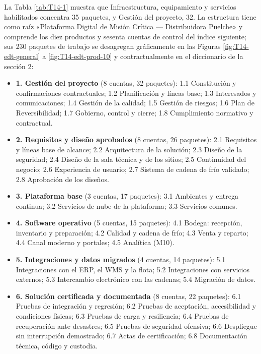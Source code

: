 
La Tabla \ref{tab:T14-1} muestra que Infraestructura, equipamiento y servicios habilitados concentra 35 paquetes, y Gestión del proyecto, 32. La estructura tiene como raíz «Plataforma Digital de Misión Crítica — Distribuidora Puelche» y comprende los diez productos y sesenta cuentas de control del índice siguiente; sus 230 paquetes de trabajo se desagregan gráficamente en las Figuras \ref{fig:T14-edt-general} a \ref{fig:T14-edt-prod-10} y contractualmente en el diccionario de la sección 2:

\begin{itemize}[leftmargin=1.4em,itemsep=2pt]
\item \textbf{1. Gestión del proyecto} (8 cuentas, 32 paquetes): 1.1 Constitución y confirmaciones contractuales; 1.2 Planificación y líneas base; 1.3 Interesados y comunicaciones; 1.4 Gestión de la calidad; 1.5 Gestión de riesgos; 1.6 Plan de Reversibilidad; 1.7 Gobierno, control y cierre; 1.8 Cumplimiento normativo y contractual.
\item \textbf{2. Requisitos y diseño aprobados} (8 cuentas, 26 paquetes): 2.1 Requisitos y líneas base de alcance; 2.2 Arquitectura de la solución; 2.3 Diseño de la seguridad; 2.4 Diseño de la sala técnica y de los sitios; 2.5 Continuidad del negocio; 2.6 Experiencia de usuario; 2.7 Sistema de cadena de frío validado; 2.8 Aprobación de los diseños.
\item \textbf{3. Plataforma base} (3 cuentas, 17 paquetes): 3.1 Ambientes y entrega continua; 3.2 Servicios de nube de la plataforma; 3.3 Servicios comunes.
\item \textbf{4. Software operativo} (5 cuentas, 15 paquetes): 4.1 Bodega: recepción, inventario y preparación; 4.2 Calidad y cadena de frío; 4.3 Venta y reparto; 4.4 Canal moderno y portales; 4.5 Analítica (M10).
\item \textbf{5. Integraciones y datos migrados} (4 cuentas, 14 paquetes): 5.1 Integraciones con el ERP, el WMS y la flota; 5.2 Integraciones con servicios externos; 5.3 Intercambio electrónico con las cadenas; 5.4 Migración de datos.
\item \textbf{6. Solución certificada y documentada} (8 cuentas, 22 paquetes): 6.1 Pruebas de integración y regresión; 6.2 Pruebas de aceptación, accesibilidad y condiciones físicas; 6.3 Pruebas de carga y resiliencia; 6.4 Pruebas de recuperación ante desastres; 6.5 Pruebas de seguridad ofensiva; 6.6 Despliegue sin interrupción demostrado; 6.7 Actas de certificación; 6.8 Documentación técnica, código y custodia.

\end{itemize}
